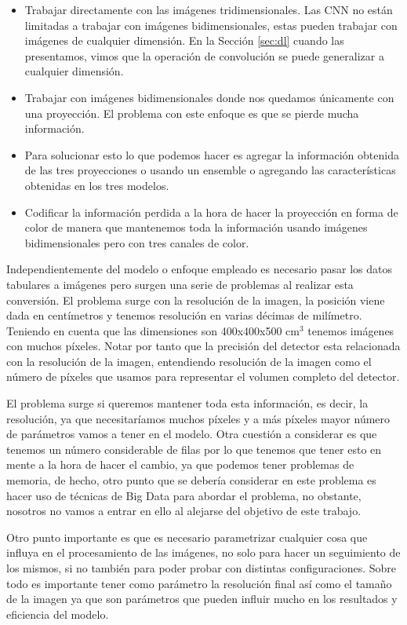 \documentclass[a4paper,12pt,twoside,titlepage]{article}
\begin{document}
\begin{itemize}
  \item Trabajar directamente con las imágenes tridimensionales. Las CNN no están limitadas a trabajar con imágenes bidimensionales, estas pueden trabajar con imágenes de cualquier dimensión. En la Sección \ref{sec:dl} cuando las presentamos, vimos que la operación de convolución se puede generalizar a cualquier dimensión.
  \item Trabajar con imágenes bidimensionales donde nos quedamos únicamente con una proyección. El problema con este enfoque es que se pierde mucha información.
  \item Para solucionar esto lo que podemos hacer es agregar la información obtenida de las tres proyecciones o usando un ensemble o agregando las características obtenidas en los tres modelos.
  \item Codificar la información perdida a la hora de hacer la proyección en forma de color de manera que mantenemos toda la información usando imágenes bidimensionales pero con tres canales de color.
\end{itemize}

Independientemente del modelo o enfoque empleado es necesario pasar los datos tabulares a imágenes pero surgen una serie de problemas al realizar esta conversión. El problema surge con la resolución de la imagen, la posición viene dada en centímetros y tenemos resolución en varias décimas de milímetro. Teniendo en cuenta que las dimensiones son 400x400x500 cm$^3$ tenemos imágenes con muchos píxeles. Notar por tanto que la precisión del detector esta relacionada con la resolución de la imagen, entendiendo resolución de la imagen como el número de píxeles que usamos para representar el volumen completo del detector.

El problema surge si queremos mantener toda esta información, es decir, la resolución, ya que necesitaríamos muchos píxeles y a más píxeles mayor número de parámetros vamos a tener en el modelo. Otra cuestión a considerar es que tenemos un número considerable de filas por lo que tenemos que tener esto en mente a la hora de hacer el cambio, ya que podemos tener problemas de memoria, de hecho, otro punto que se debería considerar en este problema es hacer uso de técnicas de Big Data para abordar el problema, no obstante, nosotros no vamos a entrar en ello al alejarse del objetivo de este trabajo.

Otro punto importante es que es necesario parametrizar cualquier cosa que influya en el procesamiento de las imágenes, no solo para hacer un seguimiento de los mismos, si no también para poder probar con distintas configuraciones. Sobre todo es importante tener como parámetro la resolución final así como el tamaño de la imagen ya que son parámetros que pueden influir mucho en los resultados y eficiencia del modelo.
\end{document}

